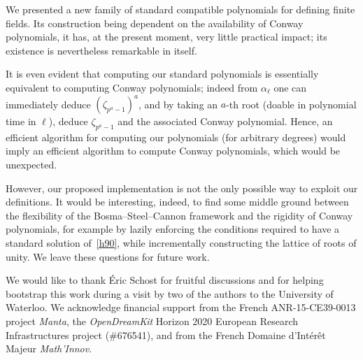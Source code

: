 \documentclass[sigconf]{acmart}
\begin{document}
We presented a new family of standard compatible polynomials for
defining finite fields. %
Its construction being dependent on the availability of Conway
polynomials, it has, at the present moment, very little practical
impact; its existence is nevertheless remarkable in itself.

It is even evident that computing our standard polynomials is
essentially equivalent to computing Conway polynomials; indeed from
$\alpha_\ell$ one can immediately deduce $(\zeta_{p^a-1})^a$, and by
taking an $a$-th root (doable in polynomial time in $\ell$), deduce
$\zeta_{p^a-1}$ and the associated Conway polynomial. %
Hence, an efficient algorithm for computing our polynomials (for
arbitrary degrees) would imply an efficient algorithm to compute
Conway polynomials, which would be unexpected.

However, our proposed implementation is not the only possible way to
exploit our definitions. %
It would be interesting, indeed, to find some middle ground between
the flexibility of the Bosma--Steel--Cannon framework and the rigidity
of Conway polynomials, for example by lazily enforcing the conditions
required to have a standard solution of~\eqref{h90}, while
incrementally constructing the lattice of roots of unity. %
We leave these questions for future work.


\begin{acks}
We would like to thank \'Eric Schost for fruitful discussions and for
helping bootstrap this work during a visit by two of the authors to
the University of Waterloo. %
We acknowledge financial support from the French ANR-15-CE39-0013
project \emph{Manta}, the \emph{OpenDreamKit} Horizon 2020 European
Research Infrastructures project (\#676541), and from the French
Domaine d'Int\'er\^et Majeur \emph{Math'Innov}.
\end{acks}


\balance

\end{document}
